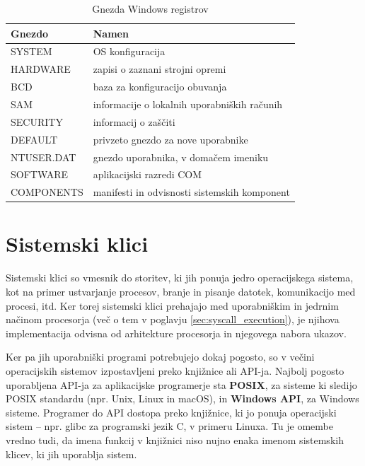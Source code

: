 \documentclass[a4paper,12pt,openright]{book}
\begin{document}
\begin{table}[h!]
	\begin{center}
		\begin{tabular}{ p{3.7cm}|p{8.8cm} }
			Gnezdo     & Namen                                         \\
			\hline
			SYSTEM     & OS konfiguracija                              \\
			HARDWARE   & zapisi o zaznani strojni opremi               \\
			BCD        & baza za konfiguracijo obuvanja                \\
			SAM        & informacije o lokalnih uporabniških računih \\
			SECURITY   & informacij o zaščiti                        \\
			DEFAULT    & privzeto gnezdo za nove uporabnike            \\
			NTUSER.DAT & gnezdo uporabnika, v domačem imeniku         \\
			SOFTWARE   & aplikacijski razredi COM                      \\
			COMPONENTS & manifesti in odvisnosti sistemskih komponent  \\
		\end{tabular}
	\end{center}
	\caption{Gnezda Windows registrov \cite{Tanenbaum_Bos_2023}}
	\label{tab:windows_registry_hives}
\end{table}

\section{Sistemski klici} \label{sec:syscalls}

Sistemski klici so vmesnik do storitev, ki jih ponuja jedro operacijskega sistema, kot na primer ustvarjanje procesov, branje in pisanje datotek, komunikacijo med procesi, itd.
Ker torej sistemski klici prehajajo med uporabniškim in jedrnim načinom procesorja (več o tem v poglavju \ref{sec:syscall_execution}), je njihova implementacija odvisna od arhitekture procesorja in njegovega nabora ukazov.

Ker pa jih uporabniški programi potrebujejo dokaj pogosto, so v večini operacijskih sistemov izpostavljeni preko knjižnice ali API-ja.
Najbolj pogosto uporabljena API-ja za aplikacijske programerje sta \textbf{POSIX}, za sisteme ki sledijo POSIX standardu (npr. Unix, Linux in macOS), in \textbf{Windows API}, za Windows sisteme.
Programer do API dostopa preko knjižnice, ki jo ponuja operacijski sistem -- npr. glibc za programski jezik C, v primeru Linuxa.
Tu je omembe vredno tudi, da imena funkcij v knjižnici niso nujno enaka imenom sistemskih klicev, ki jih uporablja sistem.
\end{document}
